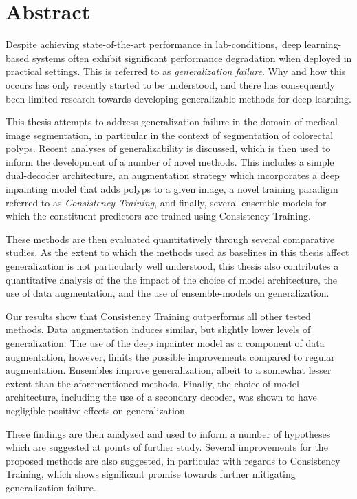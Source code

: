 \chapter*{Abstract}
    Despite achieving state-of-the-art performance in lab-conditions, deep learning-based systems often exhibit significant performance degradation when deployed in practical settings. This is referred to as \textit{generalization failure}. Why and how this occurs has only recently started to be understood, and there has consequently been limited research towards developing generalizable methods for deep learning. 
    
    This thesis attempts to address generalization failure in the domain of medical image segmentation, in particular in the context of  segmentation of colorectal polyps. Recent analyses of generalizability is discussed, which is then used to inform the development of a number of novel methods. This includes a simple dual-decoder architecture, an augmentation strategy which incorporates a deep inpainting model that adds polyps to a given image, a novel training paradigm referred to as \textit{Consistency Training}, and finally, several ensemble models for which the constituent predictors are trained using Consistency Training.
    
    These methods are then evaluated quantitatively through several comparative studies. As the extent to which the methods used as baselines in this thesis affect generalization is not particularly well understood, this thesis also contributes a quantitative analysis of the the impact of the choice of model architecture, the use of data augmentation, and the use of ensemble-models on generalization. 
    
    Our results show that Consistency Training outperforms all other tested methods. Data augmentation induces similar, but slightly lower levels of generalization. The use of the deep inpainter model as a component of data augmentation, however, limits the possible improvements compared to regular augmentation. Ensembles improve generalization, albeit to a somewhat lesser extent than the aforementioned methods. Finally, the choice of model architecture, including the use of a secondary decoder, was shown to have negligible positive effects on generalization. 
    
    These findings are then analyzed and used to inform a number of hypotheses which are suggested at points of further study. Several improvements for the proposed methods are also suggested, in particular with regards to Consistency Training, which shows significant promise towards further mitigating generalization failure. 
